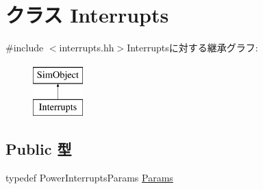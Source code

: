 \hypertarget{classPowerISA_1_1Interrupts}{
\section{クラス Interrupts}
\label{classPowerISA_1_1Interrupts}
}


{\ttfamily \#include $<$interrupts.hh$>$}Interruptsに対する継承グラフ:\begin{figure}[H]
\begin{center}
\leavevmode
\includegraphics[height=2cm]{classPowerISA_1_1Interrupts}
\end{center}
\end{figure}
\subsection*{Public 型}
\begin{DoxyCompactItemize}
\item 
typedef PowerInterruptsParams \hyperlink{classPowerISA_1_1Interrupts_afef99f4d4235119dc325f254c17f46b8}{Params}
\end{DoxyCompactItemize}
